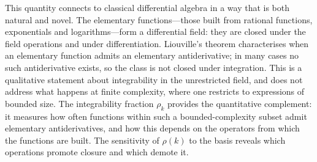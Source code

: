 \documentclass[preprint,12pt,authoryear]{elsarticle}
\newcommand{\rhok}{\rho(k)}
\newcommand{\hd}[1]{{\color{red}\textbf{[HD: #1]}}}
\begin{document}
This quantity connects to classical differential algebra in a way that is both natural and novel.
The elementary functions---those built from rational functions, exponentials and logarithms---form a differential field: they are closed under the field operations and under differentiation. Liouville's theorem \citep{Liouville1835,Rosenlicht1972} characterises when an elementary function admits an elementary antiderivative; in many cases no such antiderivative exists, so the class is not closed under integration. This is a qualitative statement about integrability in the unrestricted field, and does not address what happens at finite complexity, where one restricts to expressions of bounded size. The integrability fraction $\rho_k$ provides the quantitative complement: it measures how often functions within such a bounded-complexity subset admit elementary antiderivatives, and how this depends on the operators from which the functions are built.
The sensitivity of $\rhok$ to the basis reveals which operations promote closure and which demote it.
\end{document}
